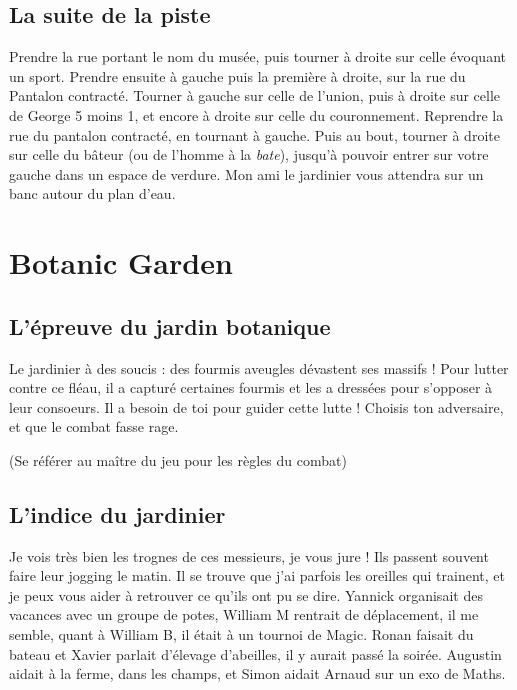\documentclass[12pt]{article}
\begin{document}
\subsection{La suite de la piste}

Prendre la rue portant le nom du musée, puis tourner à droite sur celle évoquant un sport.
Prendre ensuite à gauche puis la première à droite, sur la rue du Pantalon contracté. Tourner à gauche sur celle de l'union, puis à droite sur celle de George 5 moins 1, et encore à droite sur celle du couronnement.
Reprendre la rue du pantalon contracté, en tournant à gauche. Puis au bout, tourner à droite sur celle du bâteur (ou de l'homme à la {\it bate}), jusqu'à pouvoir entrer sur votre gauche dans un espace de verdure. Mon ami le jardinier vous attendra sur un banc autour du plan d'eau.

\section{Botanic Garden}

\subsection{L'épreuve du jardin botanique}

Le jardinier à des soucis : des fourmis aveugles dévastent ses massifs ! 
Pour lutter contre ce fléau, il a capturé certaines fourmis et les a dressées pour s'opposer à leur consoeurs.
Il a besoin de toi pour guider cette lutte ! 
Choisis ton adversaire, et que le combat fasse rage.


(Se référer au maître du jeu pour les règles du combat)

\subsection{L'indice du jardinier}


Je vois très bien les trognes de ces messieurs, je vous jure ! Ils passent souvent faire leur jogging le matin. Il se trouve que j'ai parfois les oreilles qui trainent, et je peux vous aider à retrouver ce qu'ils ont pu se dire. Yannick organisait des vacances avec un groupe de potes, William M rentrait de déplacement, il me semble, quant à William B, il était à un tournoi de Magic. Ronan faisait du bateau et Xavier parlait d'élevage d'abeilles, il y aurait passé la soirée. Augustin aidait à la ferme, dans les champs, et Simon aidait Arnaud sur un exo de Maths. 
\end{document}
